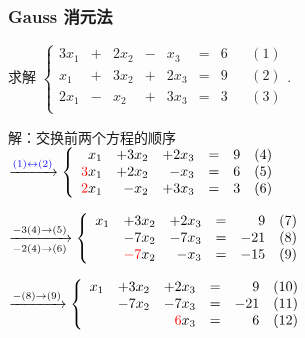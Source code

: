 \begin{frame}\frametitle{Gauss 消元法}
\begin{example}
求解 $\left\{\begin{array}{rrrrrrrrr}
3x_1 & + & 2x_2 & - & x_3 & = & 6 && (1)\\
x_1 & + & 3x_2 & + & 2x_3 & = & 9 && (2)\\
2x_1 & - & x_2 & + & 3x_3 & = & 3 && (3)\\
\end{array}\right.$.
\end{example}
\pp
\bigskip

解：交换前两个方程的顺序\\[2mm]
{ $\xrightarrow{\blue{(1)\leftrightarrow(2)}}\left\{\begin{array}{rrrrrr}
x_1 & +3x_2 & +2x_3 & =&9 & (4)\\
\red{3}x_1 &+2x_2 & -x_3 & =& 6 & (5)\\
\red{2}x_1 & -x_2 & +3x_3 & =&3 & (6)\\
\end{array}\right. $} \\[2mm]
\pp
\bigskip

{ $\xrightarrow[-2(4)\rightarrow (6)]{-3(4)\rightarrow(5)}\left\{\begin{array}{rrrrrr}
x_1 & +3x_2 & +2x_3 & =& 9 & (7)\\
& -7x_2 & -7x_3 & =& -21 & (8)\\
& \red{-7}x_2 &  -x_3 & =& -15 & (9)\\
\end{array}\right. $}\\[2mm]
\pp
\bigskip

{ $\xrightarrow{-(8)\rightarrow(9)}\left\{\begin{array}{rrrrrr}
x_1 & +3x_2 & +2x_3 & =& 9 & (10)\\
& -7x_2 & -7x_3 & =& -21 & (11)\\
&       &  \red{6}x_3 & =&   6 & (12)\\
\end{array}\right. $}
\end{frame}





